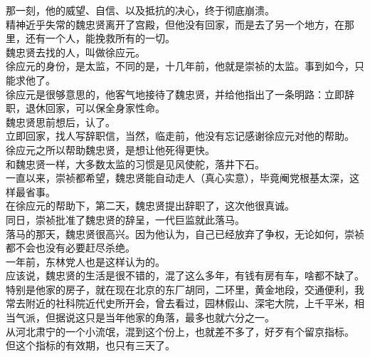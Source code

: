 \begin{multicols}{\theparacolNo}
那一刻，他的威望、自信、以及抵抗的决心，终于彻底崩溃。\\

精神近乎失常的魏忠贤离开了宫殿，但他没有回家，而是去了另一个地方，在那里，还有一个人，能挽救所有的一切。\\

魏忠贤去找的人，叫做徐应元。\\

徐应元的身份，是太监，不同的是，十几年前，他就是崇祯的太监。事到如今，只能求他了。\\

徐应元是很够意思的，他客气地接待了魏忠贤，并给他指出了一条明路：立即辞职，退休回家，可以保全身家性命。\\

魏忠贤思前想后，认了。\\

立即回家，找人写辞职信，当然，临走前，他没有忘记感谢徐应元对他的帮助。\\

徐应元之所以帮助魏忠贤，是想让他死得更快。\\

和魏忠贤一样，大多数太监的习惯是见风使舵，落井下石。\\

一直以来，崇祯都希望，魏忠贤能自动走人（真心实意），毕竟阉党根基太深，这样最省事。\\

在徐应元的帮助下，第二天，魏忠贤提出辞职了，这次他很真诚。\\

同日，崇祯批准了魏忠贤的辞呈，一代巨监就此落马。\\

落马的那天，魏忠贤很高兴。因为他认为，自己已经放弃了争权，无论如何，崇祯都不会也没有必要赶尽杀绝。\\

一年前，东林党人也是这样认为的。\\

应该说，魏忠贤的生活是很不错的，混了这么多年，有钱有房有车，啥都不缺了。特别是他家的房子，就在现在北京的东厂胡同，二环里，黄金地段，交通便利，我常去附近的社科院近代史所开会，曾去看过，园林假山、深宅大院，上千平米，相当气派，但据说这只是当年他家的角落，最多也就六分之一。\\

从河北肃宁的一个小流氓，混到这个份上，也就差不多了，好歹有个留京指标。\\

但这个指标的有效期，也只有三天了。\\


\end{multicols}
